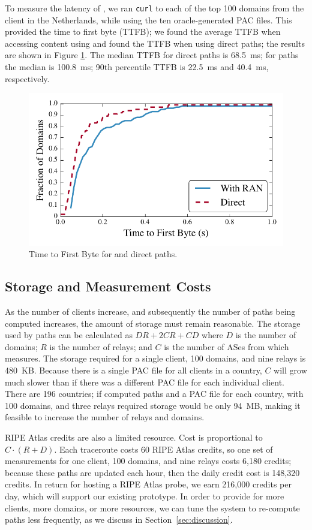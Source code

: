 To measure the latency of \system{}, we ran {\tt curl} to each of the 
top 100 domains from the client in the Netherlands, while using the ten
oracle-generated PAC files. This provided the time to first byte (TTFB); we 
found the average TTFB when accessing content using \system{} and 
found the TTFB when using direct paths; the results are shown in Figure \ref{fig:latency}.  
The median TTFB for direct paths is 68.5~ms; for \system{} paths the
median is 100.8~ms; 90th percentile TTFB is 22.5~ms and 40.4~ms, respectively.  


\begin{figure}[t]
\centering
\includegraphics[width=.5\textwidth]{latency}
\caption{Time to First Byte for \system{} and direct paths.}
\label{fig:latency}
\end{figure}


\subsection{Storage and Measurement Costs}

As the number of clients increase, and subsequently the number of paths being 
computed increases, the amount of storage must remain reasonable.  The storage 
used by paths can be calculated as
$DR + 2CR + CD$
where $D$ is the number of domains; $R$ is the number of relays; and $C$ is the
number of ASes from which \system{} measures.
The storage required for a single client, 100 domains, and nine relays is
480~KB.  Because there is a single PAC file for all clients in 
a country, $C$ will grow much slower than if there was a different PAC file for 
each individual client.  There are 196 countries; if \system{} computed
paths and a PAC file for each country, with 100 domains, and 
three relays required storage would be only 94~MB, making it
feasible to increase the number of relays and domains.

RIPE Atlas credits are also a limited resource.  Cost is proportional to
$C \cdot (R+D)$.
Each traceroute costs 60 RIPE Atlas credits, so one set of measurements
for one client, 100 domains, and nine relays costs 6,180 
credits; because these paths are updated each hour, then 
the daily credit cost is 148,320 credits.  In return for hosting a RIPE Atlas 
probe, we earn 216,000 credits per day, which will support our existing 
prototype.  In order to provide for more clients, more domains, or more 
resources, we can tune the system to re-compute paths less frequently,
as we discuss in Section~\ref{sec:discussion}.
